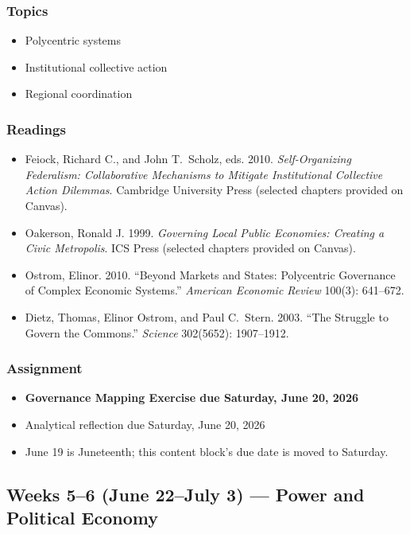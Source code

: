 \documentclass[12pt]{article}
\begin{document}
    \subsubsection*{Topics}
        \begin{itemize}
            \item Polycentric systems
            \item Institutional collective action
            \item Regional coordination
        \end{itemize}
    \subsubsection*{Readings}
        \begin{itemize}
            \item Feiock, Richard C., and John T.\ Scholz, eds. 2010. \emph{Self-Organizing Federalism: Collaborative Mechanisms to Mitigate Institutional Collective Action Dilemmas}. Cambridge University Press (selected chapters provided on Canvas).
            \item Oakerson, Ronald J. 1999. \emph{Governing Local Public Economies: Creating a Civic Metropolis}. ICS Press (selected chapters provided on Canvas).
            \item Ostrom, Elinor. 2010. ``Beyond Markets and States: Polycentric Governance of Complex Economic Systems.'' \emph{American Economic Review} 100(3): 641--672.
            \item Dietz, Thomas, Elinor Ostrom, and Paul C.\ Stern. 2003. ``The Struggle to Govern the Commons.'' \emph{Science} 302(5652): 1907--1912.
        \end{itemize}
    \subsubsection*{Assignment}
        \begin{itemize}
            \item \textbf{Governance Mapping Exercise due Saturday, June 20, 2026}
            \item Analytical reflection due Saturday, June 20, 2026
            \item June 19 is Juneteenth; this content block's due date is moved to Saturday.
        \end{itemize}

\subsection*{Weeks 5--6 (June 22--July 3) --- Power and Political Economy}
\end{document}
